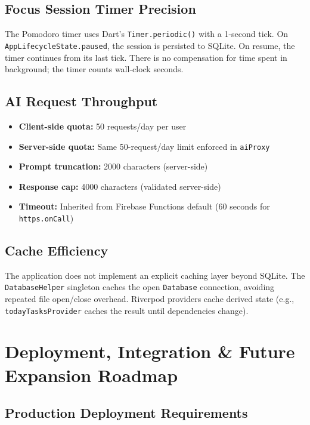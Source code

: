\documentclass[12pt,a4paper,openany]{report}
\begin{document}
\section{Focus Session Timer Precision}

The Pomodoro timer uses Dart's \texttt{Timer.periodic()} with a 1-second tick. On \texttt{AppLifecycleState.paused}, the session is persisted to SQLite. On resume, the timer continues from its last tick. There is no compensation for time spent in background; the timer counts wall-clock seconds.

\section{AI Request Throughput}

\begin{itemize}[leftmargin=*]
  \item \textbf{Client-side quota:} 50 requests/day per user
  \item \textbf{Server-side quota:} Same 50-request/day limit enforced in \texttt{aiProxy}
  \item \textbf{Prompt truncation:} 2000 characters (server-side)
  \item \textbf{Response cap:} 4000 characters (validated server-side)
  \item \textbf{Timeout:} Inherited from Firebase Functions default (60 seconds for \texttt{https.onCall})
\end{itemize}

\section{Cache Efficiency}

The application does not implement an explicit caching layer beyond SQLite. The \texttt{DatabaseHelper} singleton caches the open \texttt{Database} connection, avoiding repeated file open/close overhead. Riverpod providers cache derived state (e.g., \texttt{todayTasksProvider} caches the result until dependencies change).

\chapter{Deployment, Integration \& Future Expansion Roadmap}

\section{Production Deployment Requirements}
\end{document}
